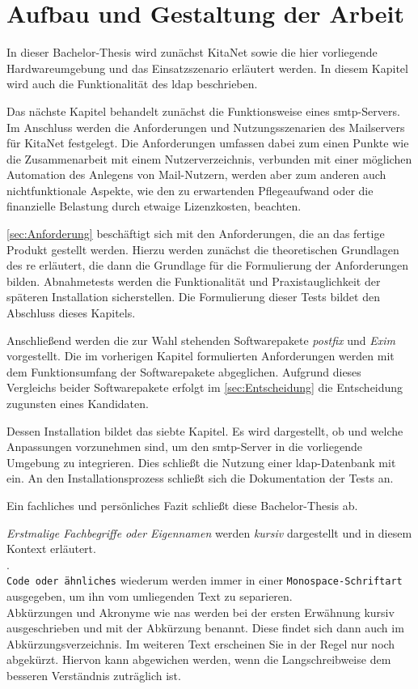 \section{Aufbau und Gestaltung der Arbeit}

In dieser Bachelor-Thesis wird zunächst KitaNet sowie die hier vorliegende Hardwareumgebung und das Einsatzszenario erläutert werden. 
In diesem Kapitel wird auch die Funktionalität des \ac{ldap} beschrieben.

Das nächste Kapitel behandelt zunächst die Funktionsweise eines \ac{smtp}-Servers. Im Anschluss werden die Anforderungen und Nutzungsszenarien des Mailservers für KitaNet festgelegt. 
Die Anforderungen umfassen dabei zum einen Punkte wie die Zusammenarbeit mit einem Nutzerverzeichnis, verbunden mit einer möglichen Automation des Anlegens von Mail-Nutzern, werden aber zum anderen auch nichtfunktionale Aspekte, wie den zu erwartenden Pflegeaufwand oder die finanzielle Belastung durch etwaige Lizenzkosten, beachten. 

\autoref{sec:Anforderung} beschäftigt sich mit den Anforderungen, die an das fertige Produkt gestellt werden. Hierzu werden zunächst die theoretischen Grundlagen des \ac{re} erläutert, die dann die Grundlage für die Formulierung der Anforderungen bilden. Abnahmetests werden die Funktionalität und Praxistauglichkeit der späteren Installation sicherstellen. Die Formulierung dieser Tests bildet den Abschluss  dieses Kapitels.

Anschließend werden die zur Wahl stehenden Softwarepakete \textit{postfix} und \textit{Exim} vorgestellt. Die im vorherigen Kapitel formulierten Anforderungen werden mit dem Funktionsumfang der Softwarepakete abgeglichen. Aufgrund dieses Vergleichs beider Softwarepakete erfolgt im \autoref{sec:Entscheidung} die Entscheidung zugunsten eines Kandidaten. 

Dessen Installation bildet das siebte Kapitel. Es wird dargestellt, ob und welche Anpassungen vorzunehmen sind, um den \ac{smtp}-Server in die vorliegende Umgebung zu integrieren. Dies schließt die Nutzung einer \ac{ldap}-Datenbank mit ein. 
An den Installationsprozess schließt sich die Dokumentation der Tests an.

Ein fachliches und persönliches Fazit schließt diese Bachelor-Thesis ab.

\textit{Erstmalige Fachbegriffe oder Eigennamen} werden \textit{kursiv} dargestellt und in diesem Kontext erläutert.  \\ . \\ \verb+Code oder ähnliches+ wiederum werden immer in einer \verb+Monospace-Schriftart+ ausgegeben, um ihn vom umliegenden Text zu separieren. \\ Abkürzungen und Akronyme wie \zb \ac{nas} werden bei der ersten Erwähnung kursiv ausgeschrieben und mit der Abkürzung benannt. Diese findet sich dann auch im Abkürzungsverzeichnis. Im weiteren Text erscheinen Sie in der Regel nur noch abgekürzt. Hiervon kann abgewichen werden, wenn die Langschreibweise dem besseren Verständnis zuträglich ist.

